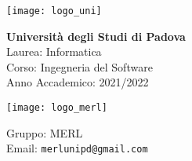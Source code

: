 \begin{minipage}[]{0.3\textwidth}
  \texttt{[image: logo\_uni]}
\end{minipage}
\begin{minipage}[]{0.7\textwidth}
  \textcolor{RossoUnipd}{
    \textbf{Università degli Studi di Padova} \\
    Laurea: Informatica \\
    Corso: Ingegneria del Software \\
    Anno Accademico: 2021/2022
  }
\end{minipage}

\bigskip

\begin{minipage}[]{0.3\textwidth}
  \texttt{[image: logo\_merl]}
\end{minipage}
\begin{minipage}[]{0.7\textwidth}
  Gruppo: MERL \\
  Email: \texttt{merlunipd@gmail.com}
\end{minipage}

\bigskip
\bigskip
\bigskip
